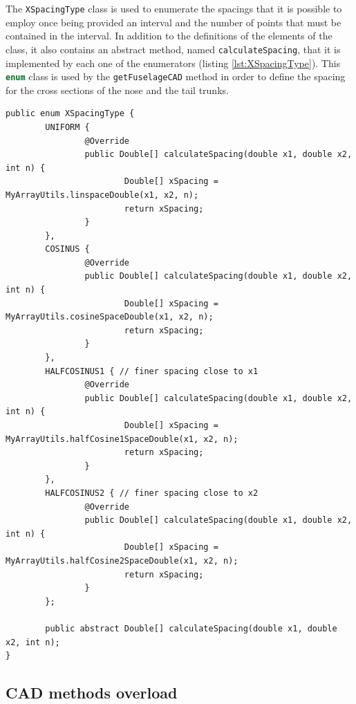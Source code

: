 The \lstinline[language=Java]!XSpacingType! class is used to enumerate the spacings that it is possible to employ once being provided an interval and the number of points that must be contained in the interval. In addition to the definitions of the elements of the class, it also contains an abstract method, named \lstinline[language=Java]!calculateSpacing!, that it is implemented by each one of the enumerators (listing \ref{lst:XSpacingType}). This \lstinline[language=Java]!enum! class is used by the \lstinline[language=Java]!getFuselageCAD! method in order to define the spacing for the cross sections of the nose and the tail trunks.
%
\bigskip
\begin{lstlisting}[caption={\lstinline!XSpacingType! class}, captionpos=b, tabsize=2, label={lst:XSpacingType}]
public enum XSpacingType {
		UNIFORM {
				@Override
				public Double[] calculateSpacing(double x1, double x2, int n) {
						Double[] xSpacing = MyArrayUtils.linspaceDouble(x1, x2, n);
						return xSpacing;
				}
		},
		COSINUS {
				@Override
				public Double[] calculateSpacing(double x1, double x2, int n) {
						Double[] xSpacing = MyArrayUtils.cosineSpaceDouble(x1, x2, n);
						return xSpacing;
				}
		},
		HALFCOSINUS1 { // finer spacing close to x1
				@Override
				public Double[] calculateSpacing(double x1, double x2, int n) {
						Double[] xSpacing = MyArrayUtils.halfCosine1SpaceDouble(x1, x2, n);
						return xSpacing;
				}
		}, 
		HALFCOSINUS2 { // finer spacing close to x2
				@Override
				public Double[] calculateSpacing(double x1, double x2, int n) {
						Double[] xSpacing = MyArrayUtils.halfCosine2SpaceDouble(x1, x2, n);
						return xSpacing;
				}
		}; 
		
		public abstract Double[] calculateSpacing(double x1, double x2, int n);
}
\end{lstlisting}

\subsection{CAD methods overload}
\label{sec3.5.3}

